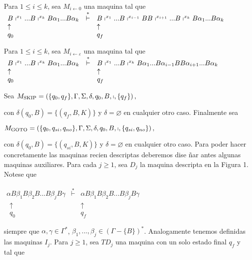 Para \(1\leq i\leq k\), sea \(M_{i\leftarrow 0}\) una maquina tal que
\(\displaystyle \begin{array}{lcl} B\shortmid ^{x_{1}}...B\shortmid ^{x_{k}}B\alpha _{1}...B\alpha _{k} & \overset{\ast }{\vdash } & B\shortmid ^{x_{1}}...B\shortmid ^{x_{i-1}}BB\shortmid ^{x_{i+1}}...B\shortmid ^{x_{k}}B\alpha _{1}...B\alpha _{k} \\ \uparrow & & \uparrow \\ q_{0} & & q_{f} \end{array} \)

Para \(1\leq i\leq k\), sea \(M_{i\leftarrow \varepsilon }\) una maquina tal que
\(\displaystyle \begin{array}{lcl} B\shortmid ^{x_{1}}...B\shortmid ^{x_{k}}B\alpha _{1}...B\alpha _{k} & \overset{\ast }{\vdash } & B\shortmid ^{x_{1}}...B\shortmid ^{x_{k}}B\alpha _{1}...B\alpha _{i-1}BB\alpha _{i+1}...B\alpha _{k} \\ \uparrow & & \uparrow \\ q_{0} & & q_{f} \end{array} \)

Sea
\(\displaystyle M_{\mathrm{SKIP}}=\left( \{q_{0},q_{f}\},\Gamma ,\Sigma ,\delta ,q_{0},B,\shortmid ,\{q_{f}\}\right) , \)

con \(\delta (q_{0},B)=\{(q_{f},B,K)\}\) y \(\delta =\varnothing \) en cualquier otro caso.
Finalmente sea

\(\displaystyle M_{\mathrm{GOTO}}=\left( \{q_{0},q_{si},q_{no}\},\Gamma ,\Sigma ,\delta ,q_{0},B,\shortmid ,\{q_{si},q_{no}\}\right) , \)

con \(\delta (q_{0},B)=\{(q_{si},B,K)\}\) y \(\delta =\varnothing \) en cualquier otro caso.
Para poder hacer concretamente las maquinas recien descriptas deberemos dise \~{n}ar antes algunas maquinas auxiliares. Para cada \(j\geq 1\), sea \(D_{j}\) la maquina descripta en la Figura 1. Notese que

\(\displaystyle \begin{array}{lcr} \alpha B\beta _{1}B\beta _{2}B...B\beta _{j}B\gamma & \overset{\ast }{\vdash } & \alpha B\beta _{1}B\beta _{2}B...B\beta _{j}B\gamma \\ \ \ \uparrow & & \uparrow \ \ \\ \ \ q_{0} & & q_{f}\ \ \end{array} \)

siempre que \(\alpha ,\gamma \in \Gamma ^{\ast }\), \(\beta _{1},...,\beta _{j}\in (\Gamma -\{B\})^{\ast }\). Analogamente tenemos definidas las maquinas \(I_{j}.\)
Para \(j\geq 1\), sea \(TD_{j}\) una maquina con un solo estado final \(q_{f}\) y tal que

